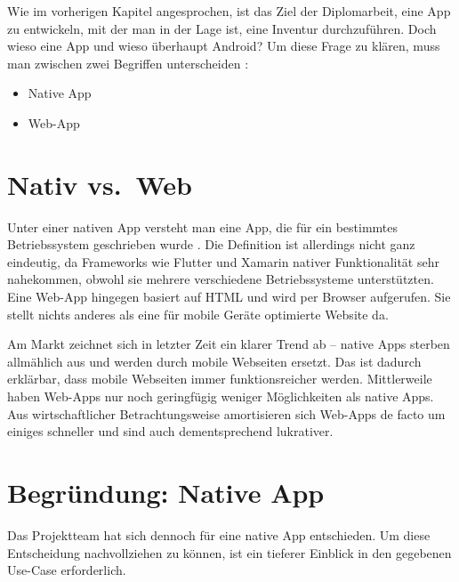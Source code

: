 Wie im vorherigen Kapitel angesprochen, ist das Ziel der Diplomarbeit,
eine App zu entwickeln, mit der man in der Lage ist, eine Inventur
durchzuführen. Doch wieso eine App und wieso überhaupt Android? Um diese
Frage zu klären, muss man zwischen zwei Begriffen unterscheiden
\cite{native-vs-web}:

\begin{itemize}
\tightlist
\item
  Native App
\item
  Web-App
\end{itemize}

\hypertarget{nativ-vs.-web}{%
\section{Nativ vs.~Web}\label{nativ-vs.-web}}

Unter einer nativen App versteht man eine App, die für ein bestimmtes
Betriebssystem geschrieben wurde \cite{native-definition}. Die
Definition ist allerdings nicht ganz eindeutig, da Frameworks wie
Flutter und Xamarin nativer Funktionalität sehr nahekommen, obwohl sie
mehrere verschiedene Betriebssysteme unterstützten. Eine Web-App
hingegen basiert auf HTML und wird per Browser aufgerufen. Sie stellt
nichts anderes als eine für mobile Geräte optimierte Website da.

Am Markt zeichnet sich in letzter Zeit ein klarer Trend ab -- native
Apps sterben allmählich aus \cite{native-trend} und werden durch mobile
Webseiten ersetzt. Das ist dadurch erklärbar, dass mobile Webseiten
immer funktionsreicher werden. Mittlerweile haben Web-Apps nur noch
geringfügig weniger Möglichkeiten als native Apps. Aus wirtschaftlicher
Betrachtungsweise amortisieren sich Web-Apps de facto um einiges
schneller und sind auch dementsprechend lukrativer.

\hypertarget{begruxfcndung-native-app}{%
\section{Begründung: Native App}\label{begruxfcndung-native-app}}

Das Projektteam hat sich dennoch für eine native App entschieden. Um
diese Entscheidung nachvollziehen zu können, ist ein tieferer Einblick
in den gegebenen Use-Case erforderlich.

